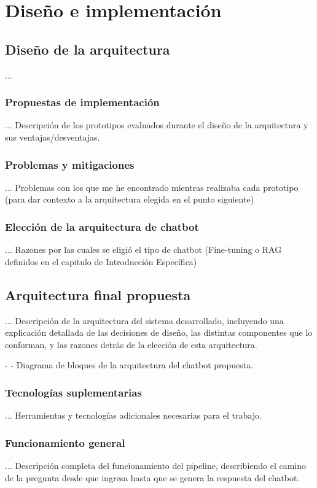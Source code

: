 \chapter{Diseño e implementación} %

\label{Chapter3} %


\section{Diseño de la arquitectura} 
...
\subsection{Propuestas de implementación} 
... Descripción de los prototipos evaluados durante el diseño de la arquitectura y sus ventajas/desventajas.
\subsection{Problemas y mitigaciones} 
... Problemas con los que me he encontrado mientras realizaba cada prototipo (para dar contexto a la arquitectura elegida en el punto siguiente)
\subsection{Elección de la arquitectura de chatbot} 
... Razones por las cuales se eligió el tipo de chatbot (Fine-tuning o RAG definidos en el capitulo de Introducción Específica)


\section{Arquitectura final propuesta} 
... Descripción de la arquitectura del sistema desarrollado, incluyendo una explicación detallada de las decisiones de diseño, las distintas componentes que lo conforman, y las razones detrás de la elección de esta arquitectura. 

- - Diagrama de bloques de la arquitectura del chatbot propuesta.

\subsection{Tecnologías suplementarias} 
... Herramientas y tecnologías adicionales necesarias para el trabajo.
\subsection{Funcionamiento general} 
... Descripción completa del funcionamiento del pipeline, describiendo el camino de la pregunta desde que ingresa hasta que se genera la respuesta del chatbot.


